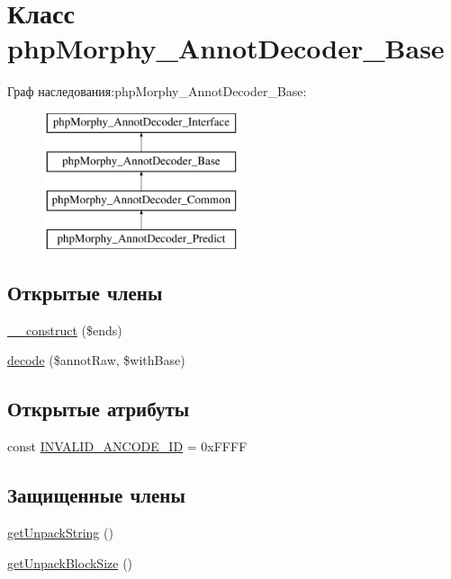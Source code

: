 \hypertarget{classphpMorphy__AnnotDecoder__Base}{
\section{Класс phpMorphy\_\-AnnotDecoder\_\-Base}
\label{classphpMorphy__AnnotDecoder__Base}
}
Граф наследования:phpMorphy\_\-AnnotDecoder\_\-Base:\begin{figure}[H]
\begin{center}
\leavevmode
\includegraphics[height=4.000000cm]{classphpMorphy__AnnotDecoder__Base}
\end{center}
\end{figure}
\subsection*{Открытые члены}
\begin{DoxyCompactItemize}
\item 
\hyperlink{classphpMorphy__AnnotDecoder__Base_af6d8724e1a936e0870726875e121a4be}{\_\-\_\-construct} (\$ends)
\item 
\hyperlink{classphpMorphy__AnnotDecoder__Base_af9deef0c1c967bba7f3aade4e768f5bb}{decode} (\$annotRaw, \$withBase)
\end{DoxyCompactItemize}
\subsection*{Открытые атрибуты}
\begin{DoxyCompactItemize}
\item 
const \hyperlink{classphpMorphy__AnnotDecoder__Base_ae44885039ce6eb80fe01f589ef96e89d}{INVALID\_\-ANCODE\_\-ID} = 0xFFFF
\end{DoxyCompactItemize}
\subsection*{Защищенные члены}
\begin{DoxyCompactItemize}
\item 
\hyperlink{classphpMorphy__AnnotDecoder__Base_abad3e144c3eddc2c29bf5e5034c23046}{getUnpackString} ()
\item 
\hyperlink{classphpMorphy__AnnotDecoder__Base_a3d7e80d72129c5b0d57468aefc2c15f3}{getUnpackBlockSize} ()
\end{DoxyCompactItemize}

